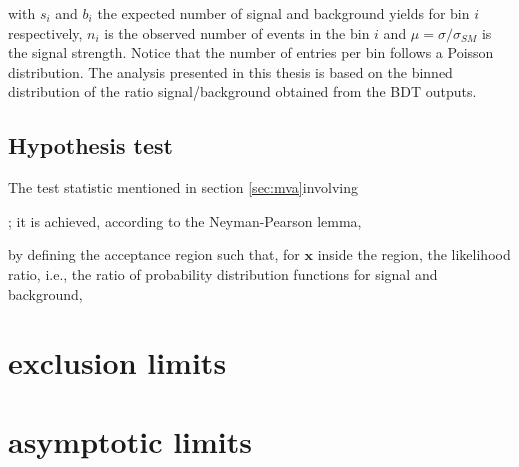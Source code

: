 \noindent with $s_i$ and $b_i$ the expected number of signal and background yields for bin $i$ respectively, $n_i$ is the observed number of events in the bin $i$ and $\mu = \sigma/\sigma_{SM}$ is the signal strength. Notice that the number of entries per bin follows a Poisson distribution. The analysis presented in this thesis is based on the binned distribution of the ratio signal/background obtained from the BDT outputs.   

\subsection{Hypothesis test}

The test statistic mentioned in section \ref{sec:mva}involving  




; it is achieved, according to the Neyman-Pearson lemma\cite{npl},






by defining the acceptance region such that, for $\textbf{x}$ inside the region, the likelihood ratio, i.e., the ratio of probability distribution functions for signal and background,



\section{exclusion limits }
\section{asymptotic limits }


 









